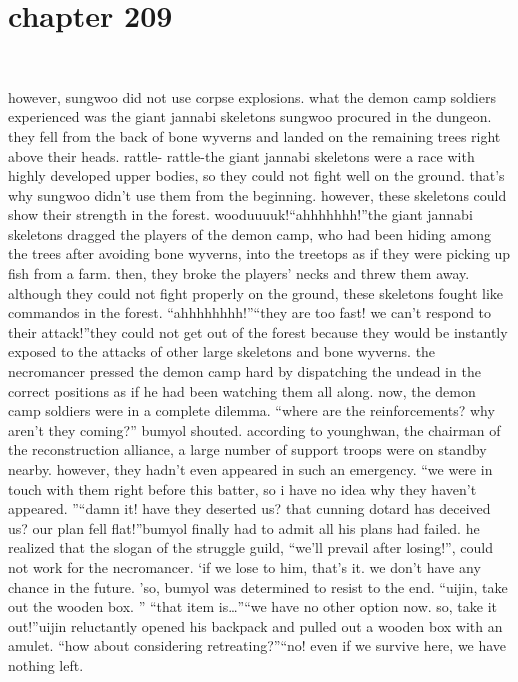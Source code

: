 \section{chapter 209}

                             




however, sungwoo did not use corpse explosions.
what the demon camp soldiers experienced was the giant jannabi skeletons sungwoo procured in the dungeon.
they fell from the back of bone wyverns and landed on the remaining trees right above their heads.
rattle- rattle-the giant jannabi skeletons were a race with highly developed upper bodies, so they could not fight well on the ground.
 that’s why sungwoo didn’t use them from the beginning.
however, these skeletons could show their strength in the forest.
wooduuuuk!“ahhhhhhh!”the giant jannabi skeletons dragged the players of the demon camp, who had been hiding among the trees after avoiding bone wyverns, into the treetops as if they were picking up fish from a farm.
 then, they broke the players’ necks and threw them away.
although they could not fight properly on the ground, these skeletons fought like commandos in the forest.
“ahhhhhhhh!”“they are too fast! we can’t respond to their attack!”they could not get out of the forest because they would be instantly exposed to the attacks of other large skeletons and bone wyverns.
the necromancer pressed the demon camp hard by dispatching the undead in the correct positions as if he had been watching them all along.
now, the demon camp soldiers were in a complete dilemma.
“where are the reinforcements? why aren’t they coming?” bumyol shouted.
according to younghwan, the chairman of the reconstruction alliance, a large number of support troops were on standby nearby.
 however, they hadn’t even appeared in such an emergency.
“we were in touch with them right before this batter, so i have no idea why they haven’t appeared.
”“damn it! have they deserted us? that cunning dotard has deceived us? our plan fell flat!”bumyol finally had to admit all his plans had failed.
he realized that the slogan of the struggle guild, “we’ll prevail after losing!”, could not work for the necromancer.
‘if we lose to him, that’s it.
 we don’t have any chance in the future.
’so, bumyol was determined to resist to the end.
“uijin, take out the wooden box.
”
“that item is…”“we have no other option now.
 so, take it out!”uijin reluctantly opened his backpack and pulled out a wooden box with an amulet.
“how about considering retreating?”“no! even if we survive here, we have nothing left.
